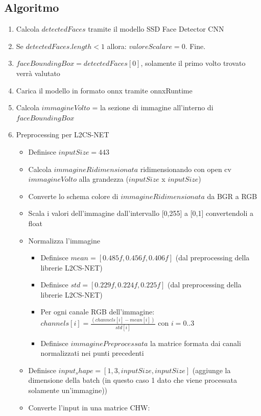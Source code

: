 \documentclass[12pt,a4paper,openright,twoside]{book}
\begin{document}
\subsection{Algoritmo}
\begin{enumerate}
    \item Calcola \(detectedFaces\) tramite il modello SSD Face Detector CNN
    \item Se \(detectedFaces.length < 1\) allora: \(valoreScalare = 0\). Fine.
    \item \(faceBoundingBox = detectedFaces[0]\), solamente il primo volto trovato verrà valutato
    \item Carica il modello in formato onnx tramite onnxRuntime
    \item Calcola \(immagineVolto\) = la sezione di immagine all'interno di \(faceBoundingBox\)
    \item Preprocessing per L2CS-NET \begin{itemize}
        \item Definisce \(inputSize = 443\)
        \item Calcola \(immagineRidimensionata\) ridimensionando con open cv \(immagineVolto\) alla grandezza (\(inputSize\) x \(inputSize\))
        \item Converte lo schema colore di \(immagineRidimensionata\) da BGR a RGB
        \item Scala i valori dell'immagine dall'intervallo [0,255] a [0,1] convertendoli a float
        \item Normalizza l'immagine \begin{itemize}
            \item Definisce \(mean = [0.485f, 0.456f, 0.406f]\) (dal preprocessing della librerie L2CS-NET)
            \item Definisce \(std = [0.229f, 0.224f, 0.225f]\) (dal preprocessing della librerie L2CS-NET)
            \item Per ogni canale RGB dell'immagine: \(channels[i] = \frac{(channels[i] - mean[i])}{std[i]}\) con \(i = 0..3\)
            \item Definisce \(immaginePreprocessata\) la matrice formata dai canali normalizzati nei punti precedenti
        \end{itemize}
        \item Definisce \(input_shape = [1, 3, inputSize, inputSize]\) (aggiunge la dimensione della batch (in questo caso 1 dato che viene processata solamente un'immagine))
        \item Converte l'input in una matrice CHW: \begin{itemize}

\end{itemize}
\end{itemize}
\end{enumerate}
\end{document}
